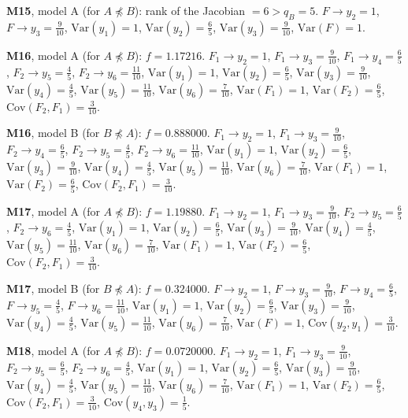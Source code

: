 \documentclass[10pt,a4paper]{article}
\newcommand{\nnest}{\not\preceq}
\begin{document}
{\noindent\textbf{M15}, model A (for $A\nnest B$): rank of the Jacobian $=6>q_B=5$. {\footnotesize $F\to y_{2}=1$, $F\to y_{3}=\tfrac{9}{10}$, $\mathrm{Var}(y_{1})=1$, $\mathrm{Var}(y_{2})=\tfrac{6}{5}$, $\mathrm{Var}(y_{3})=\tfrac{9}{10}$, $\mathrm{Var}(F)=1$.}\par\smallskip
\noindent\textbf{M16}, model A (for $A\nnest B$): $f=1.17216$. {\footnotesize $F_{1}\to y_{2}=1$, $F_{1}\to y_{3}=\tfrac{9}{10}$, $F_{1}\to y_{4}=\tfrac{6}{5}$, $F_{2}\to y_{5}=\tfrac{4}{5}$, $F_{2}\to y_{6}=\tfrac{11}{10}$, $\mathrm{Var}(y_{1})=1$, $\mathrm{Var}(y_{2})=\tfrac{6}{5}$, $\mathrm{Var}(y_{3})=\tfrac{9}{10}$, $\mathrm{Var}(y_{4})=\tfrac{4}{5}$, $\mathrm{Var}(y_{5})=\tfrac{11}{10}$, $\mathrm{Var}(y_{6})=\tfrac{7}{10}$, $\mathrm{Var}(F_{1})=1$, $\mathrm{Var}(F_{2})=\tfrac{6}{5}$, $\mathrm{Cov}(F_{2},F_{1})=\tfrac{3}{10}$.}\par\smallskip
\noindent\textbf{M16}, model B (for $B\nnest A$): $f=0.888000$. {\footnotesize $F_{1}\to y_{2}=1$, $F_{1}\to y_{3}=\tfrac{9}{10}$, $F_{2}\to y_{4}=\tfrac{6}{5}$, $F_{2}\to y_{5}=\tfrac{4}{5}$, $F_{2}\to y_{6}=\tfrac{11}{10}$, $\mathrm{Var}(y_{1})=1$, $\mathrm{Var}(y_{2})=\tfrac{6}{5}$, $\mathrm{Var}(y_{3})=\tfrac{9}{10}$, $\mathrm{Var}(y_{4})=\tfrac{4}{5}$, $\mathrm{Var}(y_{5})=\tfrac{11}{10}$, $\mathrm{Var}(y_{6})=\tfrac{7}{10}$, $\mathrm{Var}(F_{1})=1$, $\mathrm{Var}(F_{2})=\tfrac{6}{5}$, $\mathrm{Cov}(F_{2},F_{1})=\tfrac{3}{10}$.}\par\smallskip
\noindent\textbf{M17}, model A (for $A\nnest B$): $f=1.19880$. {\footnotesize $F_{1}\to y_{2}=1$, $F_{1}\to y_{3}=\tfrac{9}{10}$, $F_{2}\to y_{5}=\tfrac{6}{5}$, $F_{2}\to y_{6}=\tfrac{4}{5}$, $\mathrm{Var}(y_{1})=1$, $\mathrm{Var}(y_{2})=\tfrac{6}{5}$, $\mathrm{Var}(y_{3})=\tfrac{9}{10}$, $\mathrm{Var}(y_{4})=\tfrac{4}{5}$, $\mathrm{Var}(y_{5})=\tfrac{11}{10}$, $\mathrm{Var}(y_{6})=\tfrac{7}{10}$, $\mathrm{Var}(F_{1})=1$, $\mathrm{Var}(F_{2})=\tfrac{6}{5}$, $\mathrm{Cov}(F_{2},F_{1})=\tfrac{3}{10}$.}\par\smallskip
\noindent\textbf{M17}, model B (for $B\nnest A$): $f=0.324000$. {\footnotesize $F\to y_{2}=1$, $F\to y_{3}=\tfrac{9}{10}$, $F\to y_{4}=\tfrac{6}{5}$, $F\to y_{5}=\tfrac{4}{5}$, $F\to y_{6}=\tfrac{11}{10}$, $\mathrm{Var}(y_{1})=1$, $\mathrm{Var}(y_{2})=\tfrac{6}{5}$, $\mathrm{Var}(y_{3})=\tfrac{9}{10}$, $\mathrm{Var}(y_{4})=\tfrac{4}{5}$, $\mathrm{Var}(y_{5})=\tfrac{11}{10}$, $\mathrm{Var}(y_{6})=\tfrac{7}{10}$, $\mathrm{Var}(F)=1$, $\mathrm{Cov}(y_{2},y_{1})=\tfrac{3}{10}$.}\par\smallskip
\noindent\textbf{M18}, model A (for $A\nnest B$): $f=0.0720000$. {\footnotesize $F_{1}\to y_{2}=1$, $F_{1}\to y_{3}=\tfrac{9}{10}$, $F_{2}\to y_{5}=\tfrac{6}{5}$, $F_{2}\to y_{6}=\tfrac{4}{5}$, $\mathrm{Var}(y_{1})=1$, $\mathrm{Var}(y_{2})=\tfrac{6}{5}$, $\mathrm{Var}(y_{3})=\tfrac{9}{10}$, $\mathrm{Var}(y_{4})=\tfrac{4}{5}$, $\mathrm{Var}(y_{5})=\tfrac{11}{10}$, $\mathrm{Var}(y_{6})=\tfrac{7}{10}$, $\mathrm{Var}(F_{1})=1$, $\mathrm{Var}(F_{2})=\tfrac{6}{5}$, $\mathrm{Cov}(F_{2},F_{1})=\tfrac{3}{10}$, $\mathrm{Cov}(y_{4},y_{3})=\tfrac{1}{5}$.}\par\smallskip
}
\end{document}
